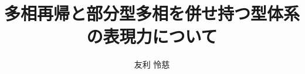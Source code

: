 \documentclass[uplatex,dvipdfmx]{jsarticle}
\title{多相再帰と部分型多相を併せ持つ型体系の表現力について}
\author{友利 怜慈}
\begin{document}
\maketitle
\begin{abstract}
    
\end{abstract}




\end{document}
